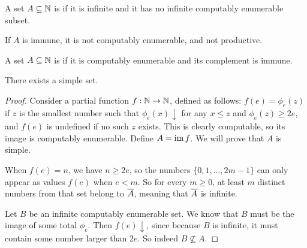 \begin{definition}
  A set $A \subseteq \mathbb{N}$ is  if it is infinite and it has no
  infinite computably enumerable subset.
\end{definition}

\begin{remark}
  If $A$ is immune, it is not computably enumerable, and not productive.
\end{remark}

\begin{definition}
  A set $A \subseteq \mathbb{N}$ is  if it is computably enumerable and
  its complement is immune.
\end{definition}

\begin{theorem}[Post]
  There exists a simple set.
\end{theorem}

\begin{proof}
  Consider a partial function $f: \mathbb{N} \to \mathbb{N}$, defined as follows:
  $f(e) = \phi_e(z)$ if $z$ is the smallest number such that $\phi_e(x)
  \downarrow$ for any $x \le z$ and $\phi_e(z) \ge 2e$, and $f(e)$ is undefined
  if no such $z$ exists.
  This is clearly computable, so its image is computably enumerable.
  Define $A = \operatorname{im} f$.
  We will prove that $A$ is simple.

  When $f(e) = n$, we have $n \ge 2e$, so the numbers $\{0, 1, \ldots, 2m-1\}$
  can only appear as values $f(e)$ when $e < m$.
  So for every $m \ge 0$, at least $m$ distinct numbers from that set belong to
  $\overline{A}$, meaning that $\overline{A}$ is infinite.

  Let $B$ be an infinite computably enumerable set.
  We know that $B$ must be the image of some total $\phi_e$.
  Then $f(e) \downarrow$, since because $B$ is infinite, it must contain some
  number larger than $2e$.
  So indeed $B \nsubseteq A$.
\end{proof}


